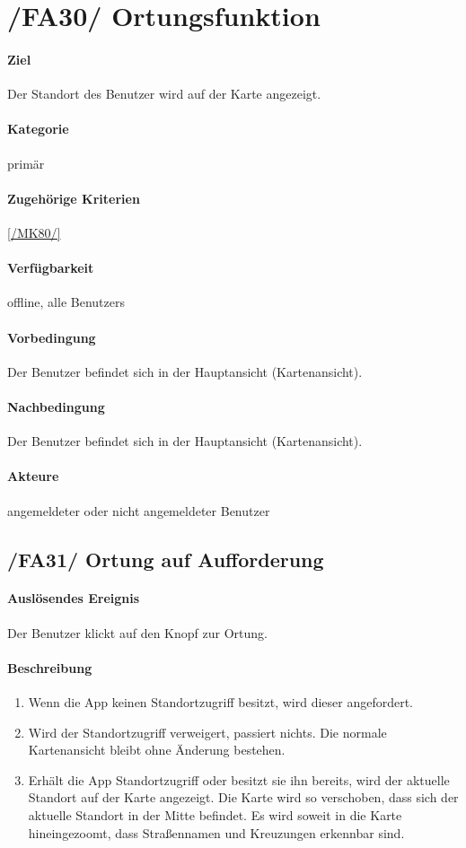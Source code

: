 \section[Ortungsfunktion]{/FA30/ Ortungsfunktion}
\label{/FA30/}
\paragraph{Ziel}
Der Standort des \Gls{Benutzer} wird auf der \Gls{Karte} angezeigt.
\paragraph{Kategorie}
primär
\paragraph{Zugehörige Kriterien}
\ref{/MK80/}
\paragraph{Verfügbarkeit}
\gls{offline}, alle \Glspl{Benutzer}
\paragraph{Vorbedingung}
Der \Gls{Benutzer} befindet sich in der Hauptansicht (\Gls{Kartenansicht}).
\paragraph{Nachbedingung}
Der \Gls{Benutzer} befindet sich in der Hauptansicht (\Gls{Kartenansicht}).
\paragraph{Akteure}
angemeldeter oder nicht angemeldeter \Gls{Benutzer}

\subsection*{/FA31/ Ortung auf Aufforderung}
\label{/FA31/}
\paragraph{Auslösendes Ereignis}
Der \Gls{Benutzer} klickt auf den Knopf zur Ortung.
\paragraph{Beschreibung}
\begin{enumerate}
    \item Wenn die App keinen Standortzugriff besitzt, wird dieser angefordert.
    \item Wird der Standortzugriff verweigert, passiert nichts. Die normale \Gls{Kartenansicht} bleibt ohne Änderung bestehen.
    \item Erhält die App Standortzugriff oder besitzt sie ihn bereits, wird der aktuelle Standort auf der \Gls{Karte} angezeigt. Die \Gls{Karte} wird so verschoben, dass sich der aktuelle Standort in der Mitte befindet. Es wird soweit in die \Gls{Karte} hineingezoomt, dass Straßennamen und Kreuzungen erkennbar sind.
\end{enumerate}

